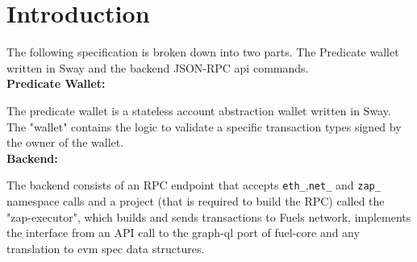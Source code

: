 \section{Introduction}
\label{sec:introduction}

The following specification is broken down into two parts. The Predicate wallet written in Sway and the backend JSON-RPC api commands. \\

\textbf{Predicate Wallet:}\

The predicate wallet is a stateless account abstraction wallet written in Sway. The "wallet" contains the logic to validate a
specific transaction types signed by the owner of the wallet. \\

\textbf{Backend:}\

The backend consists of an RPC endpoint that accepts \texttt{eth\_},\texttt{net\_} and \texttt{zap\_} namespace calls and a project
(that is required to build the RPC) called the "zap-executor", which builds and sends transactions to Fuels network, implements the interface
from an API call to the graph-ql port of fuel-core and any translation to evm spec data structures. \\